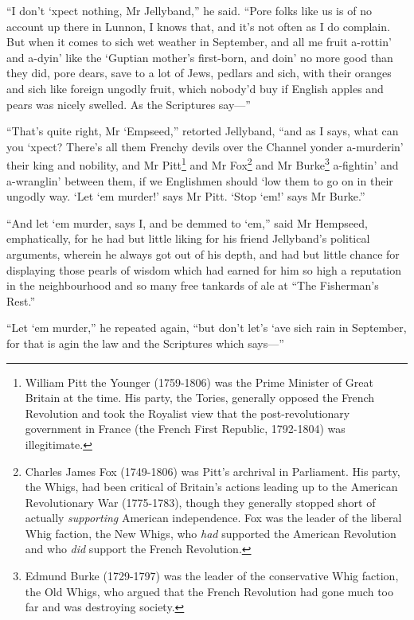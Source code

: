 \enquote{I don't `xpect nothing, Mr Jellyband,} he said. \enquote{Pore folks like us is of no account up there in Lunnon, I knows that, and it's not often as I do complain. But when it comes to sich wet weather in September, and all me fruit a-rottin’ and a-dyin’ like the `Guptian mother's first-born, and doin’ no more good than they did, pore dears, save to a lot of Jews, pedlars and sich, with their oranges and sich like foreign ungodly fruit, which nobody'd buy if English apples and pears was nicely swelled. As the Scriptures say---}

\enquote{That's quite right, Mr `Empseed,} retorted Jellyband, \enquote{and as I says, what can you `xpect? There's all them Frenchy devils over the Channel yonder a-murderin’ their king and nobility, and Mr Pitt\footnote{William Pitt the Younger (1759-1806) was the Prime Minister of Great Britain at the time. His party, the Tories, generally opposed the French Revolution and took the Royalist view that the post-revolutionary government in France (the French First Republic, 1792-1804) was illegitimate.} and Mr Fox\footnote{Charles James Fox (1749-1806) was Pitt's archrival in Parliament. His party, the Whigs, had been critical of Britain's actions leading up to the American Revolutionary War (1775-1783), though they generally stopped short of actually \textit{supporting} American independence. Fox was the leader of the liberal Whig faction, the New Whigs, who \textit{had} supported the American Revolution and who \textit{did} support the French Revolution.} and Mr Burke\footnote{Edmund Burke (1729-1797) was the leader of the conservative Whig faction, the Old Whigs, who argued that the French Revolution had gone much too far and was destroying society.}  a-fightin’ and a-wranglin’ between them, if we Englishmen should `low them to go on in their ungodly way. \enquote{Let `em murder!} says Mr Pitt. \enquote{Stop `em!} says Mr Burke.}

\enquote{And let `em murder, says I, and be demmed to `em,} said Mr Hempseed, emphatically, for he had but little liking for his friend Jellyband's political arguments, wherein he always got out of his depth, and had but little chance for displaying those pearls of wisdom which had earned for him so high a reputation in the neighbourhood and so many free tankards of ale at \enquote{The Fisherman's Rest.}

\enquote{Let `em murder,} he repeated again, \enquote{but don't let's `ave sich rain in September, for that is agin the law and the Scriptures which says---}

